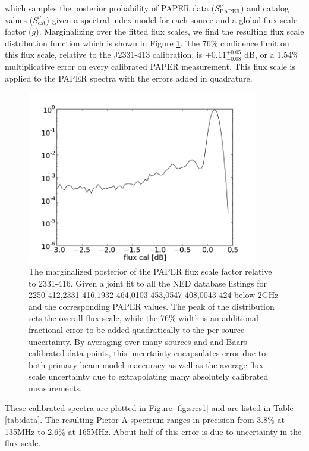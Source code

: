 \documentclass[preprint]{aastex}
\newcommand{\PAPER}{\mathrm{PAPER}}
\begin{document}
which samples the posterior probability of PAPER data ($S_\PAPER^{\nu}$) and
catalog values ($S_\textrm{cat}^{\nu}$) given a spectral index model for each source and
a global flux scale factor ($g$).
Marginalizing over the fitted flux scales, we find the resulting flux scale distribution function which is shown in Figure
\ref{fig:gain}. The 76\% confidence limit on this flux scale, relative to the
J2331-413 calibration, is  $+0.11 ^{+0.05}_{-0.08}$ dB, or a 1.54\%
multiplicative error on every calibrated PAPER measurement.  This flux scale is applied to the PAPER spectra
with the errors added in quadrature.
\begin{figure}
\centering
\includegraphics[width=0.9\textwidth]{plots/2250-412_2331-416_1932-464_0103-453_0547-408_0043-424_gain_mcmc_chain_gain_conf.png}
\caption{
The marginalized posterior of the PAPER flux scale factor relative to 2331-416. Given a joint fit to all the
 NED database listings for
2250-412,2331-416,1932-464,0103-453,0547-408,0043-424 below 2GHz and the corresponding PAPER values. The peak of the distribution sets the overall flux scale,
while the 76\% width is an additional
 fractional error to be added quadratically to the per-source uncertainty.  
By averaging over many sources and and Baars calibrated data points, this uncertainty encapsulates error due to both primary beam model inaccuracy 
as well as the average flux scale uncertainty due to extrapolating many absolutely calibrated measurements.
\label{fig:gain}}
\end{figure}

These calibrated spectra are plotted in Figure \ref{fig:srcs1} and are listed in Table \ref{tab:data}.  The
resulting Pictor A spectrum ranges in precision from 3.8\% at 135MHz to 2.6\%
at 165MHz. About half of this error is due to uncertainty in the flux scale.  
\end{document}
